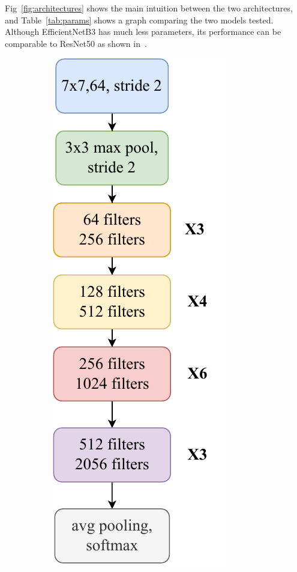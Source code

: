 \documentclass[conference]{IEEEtran}
\begin{document}
Fig~\ref{fig:architectures} shows the main intuition between the two architectures, and Table~\ref{tab:params}
shows a graph comparing the two models tested.
Although EfficientNetB3 has much less parameters, its performance can be comparable to ResNet50 as shown
in~\cite{tan2019efficientnet}.

\begin{figure}[!t]
	\centering
	\begin{subfigure}{0.4\textwidth}
		\centering
		\includegraphics[scale=0.5]{arch-resnet}
		\caption{}
		\label{fig:resnet}
	\end{subfigure}

\end{figure}
\end{document}
